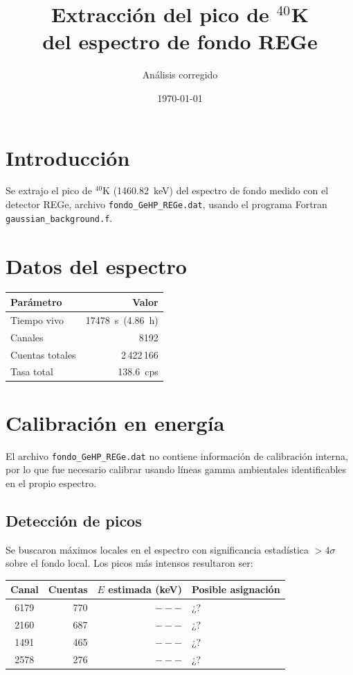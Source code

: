 \documentclass[10pt,a4paper]{article}
\title{Extracci\'on del pico de $^{40}$K\\del espectro de fondo REGe}
\author{An\'alisis corregido}
\date{\today}
\begin{document}
\maketitle

\section{Introducci\'on}

Se extrajo el pico de $^{40}$K (1460.82~keV) del espectro de fondo medido con el detector REGe,
archivo \texttt{fondo\_GeHP\_REGe.dat}, usando el programa Fortran
\texttt{gaussian\_background.f}.

\section{Datos del espectro}

\begin{center}
\begin{tabular}{lr}
\hline
Par\'ametro & Valor \\
\hline
Tiempo vivo & 17478~s~(4.86~h) \\
Canales & 8192 \\
Cuentas totales & 2\,422\,166 \\
Tasa total & 138.6~cps \\
\hline
\end{tabular}
\end{center}

\section{Calibraci\'on en energ\'ia}

El archivo \texttt{fondo\_GeHP\_REGe.dat} no contiene informaci\'on de calibraci\'on interna, por lo
que fue necesario calibrar usando l\'ineas gamma ambientales identificables en el propio espectro.

\subsection{Detecci\'on de picos}

Se buscaron m\'aximos locales en el espectro con significancia estad\'istica $>4\sigma$ sobre el fondo
local. Los picos m\'as intensos resultaron ser:

\begin{center}
\begin{tabular}{crrl}
\hline
Canal & Cuentas & $E$ estimada (keV) & Posible asignaci\'on \\
\hline
6179 & 770 & $---$ & ¿? \\
2160 & 687 & $---$ & ¿? \\
1491 & 465 & $---$ & ¿? \\
2578 & 276 & $---$ & ¿? \\
\hline
\end{tabular}
\end{center}
\end{document}
